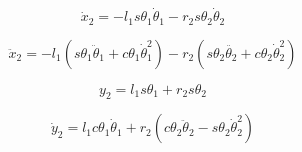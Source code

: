 \begin{equation}
	\dot{x}_2 = 
		- l_1 s \theta_1 \dot{\theta}_1
		- r_2 s \theta_2  \dot{\theta}_2
	\label{eq:8_13b}
\end{equation}


\begin{equation}
	\ddot{x}_2 = 
		- l_1 ( s \theta_1 \ddot{\theta}_1  +  c \theta_1 \dot{\theta}_1^2)
		- r_2 ( s \theta_2 \ddot{\theta_2}  +  c \theta_2 \dot{\theta}_2^2 )
	\label{eq:8_13c}
\end{equation}


\begin{equation}
	y_2 = l_1 s \theta_1  +  r_2 s \theta_2
	\label{eq:8_14a}
\end{equation}


\begin{equation}
	\dot{y}_2  = l_1 c \theta_1  \dot{\theta}_1 
	+ r_2 ( c  \theta_2  \ddot{\theta}_2  -  s \theta_2 \dot{\theta}_2^2)
	\label{eq:8_14c}
\end{equation}









